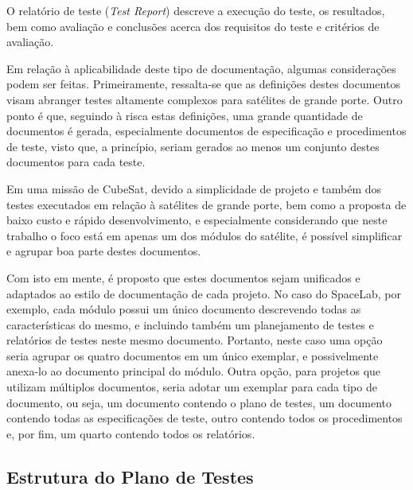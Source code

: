 O relatório de teste (\textit{Test Report}) descreve a execução do teste, os resultados, bem como avaliação e conclusões acerca dos requisitos do teste e critérios de avaliação.


Em relação à aplicabilidade deste tipo de documentação, algumas considerações podem ser feitas.
Primeiramente, ressalta-se que as definições destes documentos visam abranger testes altamente complexos para satélites de grande porte.
Outro ponto é que, seguindo à risca estas definições, uma grande quantidade de documentos é gerada, especialmente documentos de especificação e procedimentos de teste, visto que, a princípio, seriam gerados ao menos um conjunto destes documentos para cada teste.

Em uma missão de CubeSat, devido a simplicidade de projeto e também dos testes executados em relação à satélites de grande porte, bem como a proposta de baixo custo e rápido desenvolvimento, e especialmente considerando que neste trabalho o foco está em apenas um dos módulos do satélite, é possível simplificar e agrupar boa parte destes documentos.

Com isto em mente, é proposto que estes documentos sejam unificados e adaptados ao estilo de documentação de cada projeto.
No caso do SpaceLab, por exemplo, cada módulo possui um único documento descrevendo todas as características do mesmo, e incluindo também um planejamento de testes e relatórios de testes neste mesmo documento. Portanto, neste caso uma opção seria agrupar os quatro documentos em um único exemplar, e possivelmente anexa-lo ao documento principal do módulo.
Outra opção, para projetos que utilizam múltiplos documentos, seria adotar um exemplar para cada tipo de documento, ou seja, um documento contendo o plano de testes, um documento contendo todas as especificações de teste, outro contendo todos os procedimentos e, por fim, um quarto contendo todos os relatórios.


\subsection{Estrutura do Plano de Testes} \label{sec:estrutura-plano-testes}


